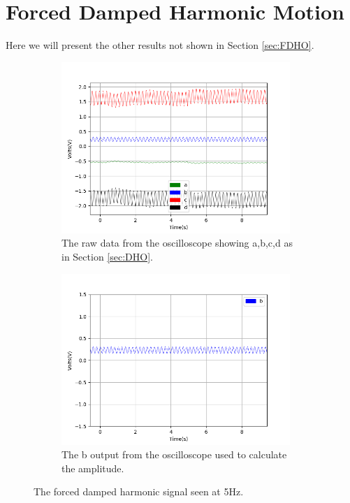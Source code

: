 \clearpage
\section{Forced Damped Harmonic Motion} \label{append:FDHO}

Here we will present the other results not shown in Section \ref{sec:FDHO}. 

\begin{figure}[h!]
\centering
\begin{subfigure}[t]{.475\textwidth}
  \centering
  \includegraphics[width=0.95\textwidth, height=0.20\textheight]{figures/FDHO/scope_38raw.png}
  \caption{The raw data from the oscilloscope showing a,b,c,d as in Section \ref{sec:DHO}.}
 \label{fig:FDHO_5Hz_raw}
\end{subfigure}\hfill
\begin{subfigure}[t]{.475\textwidth}
  \centering
  \includegraphics[width=0.95\textwidth, height=0.20\textheight]{figures/FDHO/scope_38v_2.png}
  \caption{The b output from the oscilloscope used to calculate the amplitude.}
\label{fig:FDHO_5Hz_b}
\end{subfigure}
\caption{The forced damped harmonic signal seen at 5Hz.}
\label{fig:FDHO_5Hz}
\end{figure}

